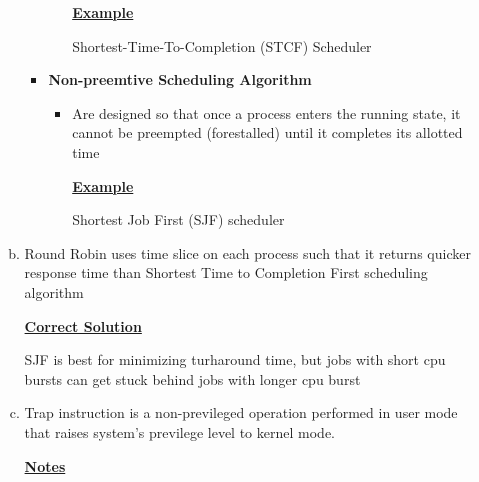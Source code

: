 \documentclass[12pt]{article}
\begin{document}
\begin{enumerate}[1.]
\begin{enumerate}[a)]
\begin{itemize}
\begin{itemize}
                \bigskip

                \underline{\textbf{Example}}

                \bigskip

                Shortest-Time-To-Completion (STCF) Scheduler

                \bigskip
            \end{itemize}
            \item \textbf{Non-preemtive Scheduling Algorithm}

            \begin{itemize}
                \item Are designed so that once a process enters the running state,
                it cannot be preempted (forestalled) until it completes its allotted time

                \bigskip

                \underline{\textbf{Example}}

                \bigskip

                Shortest Job First (SJF) scheduler
            \end{itemize}
        \end{itemize}

        \item

        Round Robin uses time slice on each process such that it returns
        quicker response time than Shortest Time to Completion First scheduling algorithm

        \bigskip

        \begin{mdframed}
        \underline{\textbf{Correct Solution}}

        \bigskip

        \color{red}SJF is best for minimizing turharound time, but jobs with short cpu bursts
        can get stuck behind jobs with longer cpu burst\color{black}

        \end{mdframed}

        \item

        Trap instruction is a non-previleged operation performed in user mode that
        raises system's previlege level to kernel mode.

        \bigskip

        \underline{\textbf{Notes}}


\end{enumerate}
\end{enumerate}
\end{document}
